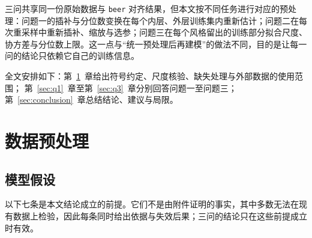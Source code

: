 \documentclass[UTF8,a4paper,zihao=-4]{ctexart}
\numberwithin{figure}{section}
\numberwithin{table}{section}
\numberwithin{equation}{section}
\newcommand{\file}[1]{\texttt{#1}}
\begin{document}
三问共享同一份原始数据与 \file{beer} 对齐结果，但本文按不同任务进行对应的预处理：问题一的插补与分位数变换在每个内层、外层训练集内重新估计；问题二在每次重采样中重新插补、缩放与选参；问题三在每个风格留出的训练部分拟合尺度、协方差与分位数上限。这一点与“统一预处理后再建模”的做法不同，目的是让每一问的结论只依赖它自己的训练信息。

全文安排如下：第~\ref{sec:preprocess}~章给出符号约定、尺度核验、缺失处理与外部数据的使用范围；
第~\ref{sec:q1}~章至第~\ref{sec:q3}~章分别回答问题一至问题三；
第~\ref{sec:conclusion}~章总结结论、建议与局限。

\section{数据预处理}
\label{sec:preprocess}

\subsection{模型假设}

以下七条是本文结论成立的前提。它们不是由附件证明的事实，其中多数无法在现有数据上检验，因此每条同时给出依据与失效后果；三问的结论只在这些前提成立时有效。
\end{document}
